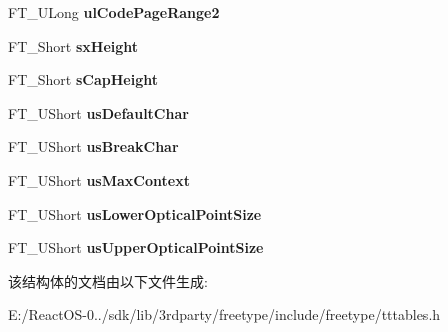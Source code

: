 \begin{DoxyCompactItemize}
\item 
\mbox{\label{struct_t_t___o_s2___ad117c64d73d15d1304c75fb5f41f1124}} 
F\+T\+\_\+\+U\+Long {\bfseries ul\+Code\+Page\+Range2}
\item 
\mbox{\label{struct_t_t___o_s2___a2eb3bb1392461a536c393304bde72835}} 
F\+T\+\_\+\+Short {\bfseries sx\+Height}
\item 
\mbox{\label{struct_t_t___o_s2___ac755913b648d535d1207927e4a6f1ec0}} 
F\+T\+\_\+\+Short {\bfseries s\+Cap\+Height}
\item 
\mbox{\label{struct_t_t___o_s2___af8639fefeb705a9287df996b224462ea}} 
F\+T\+\_\+\+U\+Short {\bfseries us\+Default\+Char}
\item 
\mbox{\label{struct_t_t___o_s2___a1d47030e246d2593ec3e4cdf66b17161}} 
F\+T\+\_\+\+U\+Short {\bfseries us\+Break\+Char}
\item 
\mbox{\label{struct_t_t___o_s2___a167313e407c77db2c4ca5a987f3a1482}} 
F\+T\+\_\+\+U\+Short {\bfseries us\+Max\+Context}
\item 
\mbox{\label{struct_t_t___o_s2___a76193c4f0a29357bab8d8d70af10121a}} 
F\+T\+\_\+\+U\+Short {\bfseries us\+Lower\+Optical\+Point\+Size}
\item 
\mbox{\label{struct_t_t___o_s2___a8b068c0e31e8c8de527f010b9860d2ae}} 
F\+T\+\_\+\+U\+Short {\bfseries us\+Upper\+Optical\+Point\+Size}
\end{DoxyCompactItemize}


该结构体的文档由以下文件生成\+:\begin{DoxyCompactItemize}
\item 
E\+:/\+React\+O\+S-\/0../sdk/lib/3rdparty/freetype/include/freetype/tttables.\+h\end{DoxyCompactItemize}
